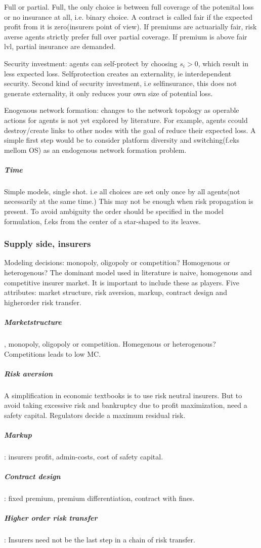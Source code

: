  Full or partial. Full, the only choice is between full coverage of the potenital loss or no insurance at all, i.e. binary choice.
A contract is called fair if the expected profit from it is zero(insurers point of view).
 If premiums are actuarially fair, risk averse agents strictly prefer full over partial coverage. 
If premium is above fair lvl, partial insurance are demanded. 

Security investment: agents can self-protect by choosing $s_{i}>0$, which result in less expected loss. 
Selfprotection creates an externality, ie interdependent security.
Second kind of security investment, i.e selfinsurance, this does not generate externality, 
it only reduces your own size of potential loss. 

Enogenous network formation: changes to the network topology as operable actions for agents is not yet explored by literature.
For example, agents ccould destroy/create links to other nodes with the goal of reduce their expected loss. 
A simple first step would be to consider platform diversity and switching(f.eks mellom OS) as an endogenous network formation problem. 

\subparagraph{Time}
Simple models, single shot. i.e all choices are set only once by all agents(not necessarily at the same time.)
This may not be enough when risk propagation is present. To avoid ambiguity the order should be specified in the model formulation, f.eks from the center of a star-shaped to its leaves.
\subsubsection{Supply side, insurers}
Modeling decisions: monopoly, oligopoly or competition? Homogenous or heterogenous?
The dominant model used in literature is naive, homogenous and competitive insurer market. 
It is important to include these as players. 
Five attributes: market structure, risk aversion, markup, contract design and higherorder risk transfer.
\subparagraph{ Marketstructure}, monopoly, oligopoly or competition. Homegenous or heterogenous? 
Competitions leads to low MC. 
\subparagraph{ Risk aversion} A simplification in economic textbooks is to use risk neutral insurers.
But to avoid taking excessive risk and bankruptcy due to profit maximization, need a safety capital. Regulators decide a maximum residual risk. 
\subparagraph{Markup}: insurers profit, admin-costs, cost of safety capital. 
\subparagraph{Contract design}: fixed premium, premium differentiation, contract with fines.
\subparagraph{Higher order risk transfer}:
Insurers need not be the last step in a chain of risk transfer. 

